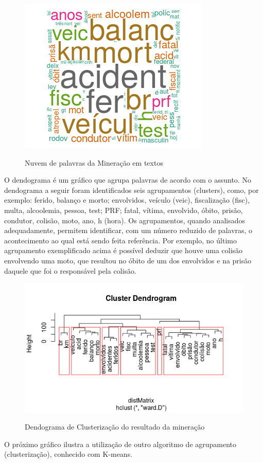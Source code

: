 \begin{figure}
\centering
\caption{Nuvem de palavras da Mineração em textos}
\includegraphics[width=0.5\linewidth]{Figuras/Twitter/nuvem2}
\label{fig:Nuvem1}
\end{figure}


\pagebreak

O dendograma é um gráfico que agrupa palavras de acordo com o assunto. No dendograma a seguir foram identificados seis agrupamentos (clusters), como, por exemplo: ferido, balanço e morto; envolvidos, veículo (veic), fiscalização (fisc), multa, alcoolemia, pessoa, test; PRF; fatal, vítima, envolvido, óbito, prisão, condutor, colisão, moto, ano, h (hora). Os agrupamentos, quando analisados adequadamente, permitem identificar, com um número reduzido de palavras, o acontecimento ao qual está sendo feita referência. Por exemplo, no último agrupamento exemplificado acima é possível deduzir que houve uma colisão envolvendo uma moto, que resultou no óbito de um dos envolvidos e na prisão daquele que foi o responsável pela colisão.   

\begin{figure}
\centering
\caption{Dendograma de Clusterização do resultado da mineração}
\includegraphics[width=0.7\linewidth]{Figuras/Twitter//Cluster}
\label{fig:Cluster}
\end{figure}

O próximo gráfico ilustra a utilização de outro algoritmo de agrupamento (clusterização), conhecido com K-means. 

